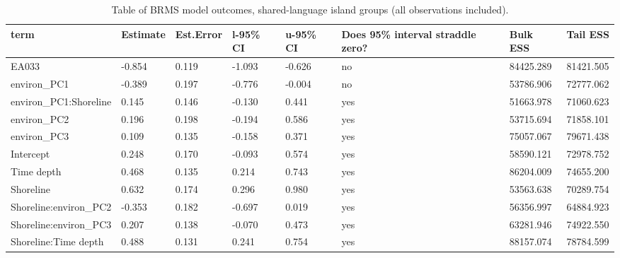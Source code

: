 \begin{table}[ht]
\centering
\begin{tabular}{p{5cm}p{2cm}p{2cm}p{2cm}p{2cm}p{2cm}p{2cm}p{2cm}}
  \toprule
term & Estimate & Est.Error & l-95\% CI & u-95\% CI & Does 95\% interval straddle zero? & Bulk ESS & Tail ESS \\ 
  \midrule
EA033 & -0.854 & 0.119 & -1.093 & -0.626 & no & 84425.289 & 81421.505 \\ 
  environ\_PC1 & -0.389 & 0.197 & -0.776 & -0.004 & no & 53786.906 & 72777.062 \\ 
  environ\_PC1:Shoreline & 0.145 & 0.146 & -0.130 & 0.441 & yes & 51663.978 & 71060.623 \\ 
  environ\_PC2 & 0.196 & 0.198 & -0.194 & 0.586 & yes & 53715.694 & 71858.101 \\ 
  environ\_PC3 & 0.109 & 0.135 & -0.158 & 0.371 & yes & 75057.067 & 79671.438 \\ 
  Intercept & 0.248 & 0.170 & -0.093 & 0.574 & yes & 58590.121 & 72978.752 \\ 
  Time depth & 0.468 & 0.135 & 0.214 & 0.743 & yes & 86204.009 & 74655.200 \\ 
  Shoreline & 0.632 & 0.174 & 0.296 & 0.980 & yes & 53563.638 & 70289.754 \\ 
  Shoreline:environ\_PC2 & -0.353 & 0.182 & -0.697 & 0.019 & yes & 56356.997 & 64884.923 \\ 
  Shoreline:environ\_PC3 & 0.207 & 0.138 & -0.070 & 0.473 & yes & 63281.946 & 74922.550 \\ 
  Shoreline:Time depth & 0.488 & 0.131 & 0.241 & 0.754 & yes & 88157.074 & 78784.599 \\ 
   \bottomrule
\end{tabular}
\caption{Table of BRMS model outcomes, shared-language island groups (all observations included).} 
\label{BRMS_effects_medium}
\end{table}
